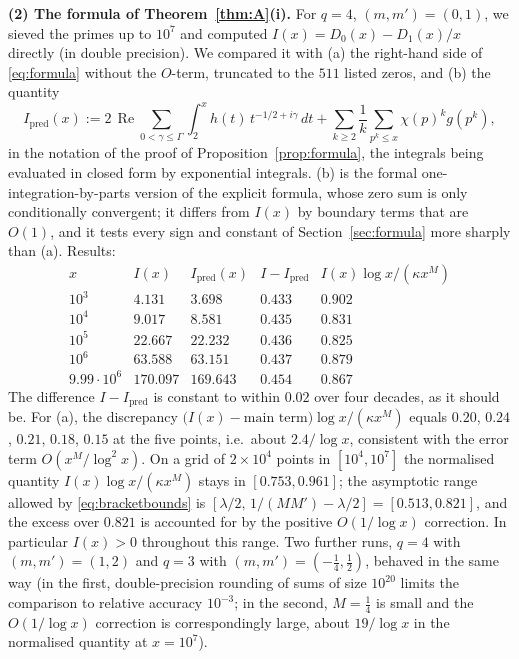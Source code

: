 \documentclass[11pt]{amsart}
\theoremstyle{definition}
\numberwithin{equation}{section}
\newcommand{\re}{\operatorname{Re}}
\begin{document}
\medskip\noindent\textbf{(2) The formula of Theorem~\ref{thm:A}(i).}
For $q=4$, $(m,m')=(0,1)$, we sieved the primes up to $10^7$ and
computed $I(x)=D_0(x)-D_1(x)/x$ directly (in double precision). We
compared it with (a) the right-hand side of \eqref{eq:formula} without
the $O$-term, truncated to the $511$ listed zeros, and (b) the
quantity
\[
I_{\mathrm{pred}}(x):=2\,\re\sum_{0<\gamma\le\Gamma}\int_2^xh(t)\,
t^{-1/2+i\gamma}\,dt+\sum_{k\ge2}\frac1k\sum_{p^k\le x}\chi(p)^kg(p^k),
\]
in the notation of the proof of Proposition~\ref{prop:formula}, the
integrals being evaluated in closed form by exponential integrals.
(b) is the formal one-integration-by-parts version of the explicit
formula, whose zero sum is only conditionally convergent; it differs
from $I(x)$ by boundary terms that are $O(1)$, and it tests every sign
and constant of Section~\ref{sec:formula} more sharply than (a).
Results:
\[
\begin{array}{r|rrr|r}
x & I(x) & I_{\mathrm{pred}}(x) & I-I_{\mathrm{pred}} &
I(x)\log x/(\kappa x^M)\\\hline
10^3 & 4.131 & 3.698 & 0.433 & 0.902\\
10^4 & 9.017 & 8.581 & 0.435 & 0.831\\
10^5 & 22.667 & 22.232 & 0.436 & 0.825\\
10^6 & 63.588 & 63.151 & 0.437 & 0.879\\
9.99\cdot10^6 & 170.097 & 169.643 & 0.454 & 0.867
\end{array}
\]
The difference $I-I_{\mathrm{pred}}$ is constant to within $0.02$
over four decades, as it should be. For (a), the discrepancy
$\bigl(I(x)-\text{main term}\bigr)\log x/(\kappa x^M)$ equals
$0.20$, $0.24$, $0.21$, $0.18$, $0.15$ at the five points, i.e.\
about $2.4/\log x$, consistent with the error term
$O(x^M/\log^2x)$. On a grid of $2\times10^4$ points in
$[10^4,10^7]$ the normalised quantity $I(x)\log x/(\kappa x^M)$
stays in $[0.753,0.961]$; the asymptotic range allowed by
\eqref{eq:bracketbounds} is
$[\lambda/2,\,1/(MM')-\lambda/2]=[0.513,0.821]$, and the excess over
$0.821$ is accounted for by the positive $O(1/\log x)$ correction. In
particular $I(x)>0$ throughout this range. Two further runs, $q=4$
with $(m,m')=(1,2)$ and $q=3$ with $(m,m')=(-\tfrac14,\tfrac12)$,
behaved in the same way (in the first, double-precision rounding of
sums of size $10^{20}$ limits the comparison to relative accuracy
$10^{-3}$; in the second, $M=\tfrac14$ is small and the $O(1/\log x)$
correction is correspondingly large, about $19/\log x$ in the
normalised quantity at $x=10^7$).
\end{document}
